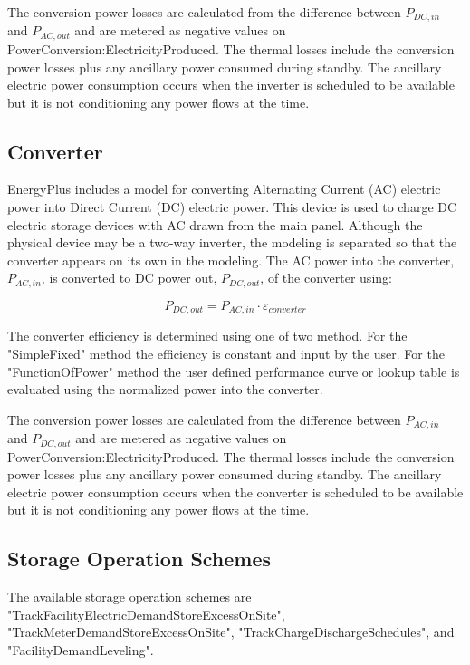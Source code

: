 The conversion power losses are calculated from the difference between ${P_{DC,in}}$ and ${P_{AC,out}}$ and are metered as negative values on PowerConversion:ElectricityProduced.  The thermal losses include the conversion power losses plus any ancillary power consumed during standby.  The ancillary electric power consumption occurs when the inverter is scheduled to be available but it is not conditioning any power flows at the time.

\subsection{Converter}

EnergyPlus includes a model for converting Alternating Current (AC) electric power into Direct Current (DC) electric power.  This device is used to charge DC electric storage devices with AC drawn from the main panel.  Although the physical device may be a two-way inverter, the modeling is separated so that the converter appears on its own in the modeling. The AC power into the converter, ${P_{AC,in}}$, is converted to DC power out, ${P_{DC,out}}$, of the converter using:

\begin{equation}
  {P_{DC,out}} = {P_{AC,in}} \cdot {\varepsilon_{converter}}
\end{equation}

The converter efficiency is determined using one of two method.  For the "SimpleFixed" method the efficiency is constant and input by the user.  For the "FunctionOfPower" method the user defined performance curve or lookup table is evaluated using the normalized power into the converter.

The conversion power losses are calculated from the difference between ${P_{AC,in}}$ and ${P_{DC,out}}$ and are metered as negative values on PowerConversion:ElectricityProduced.  The thermal losses include the conversion power losses plus any ancillary power consumed during standby.  The ancillary electric power consumption occurs when the converter is scheduled to be available but it is not conditioning any power flows at the time.

\subsection{Storage Operation Schemes}

The available storage operation schemes are "TrackFacilityElectricDemandStoreExcessOnSite", "TrackMeterDemandStoreExcessOnSite", "TrackChargeDischargeSchedules", and "FacilityDemandLeveling".

